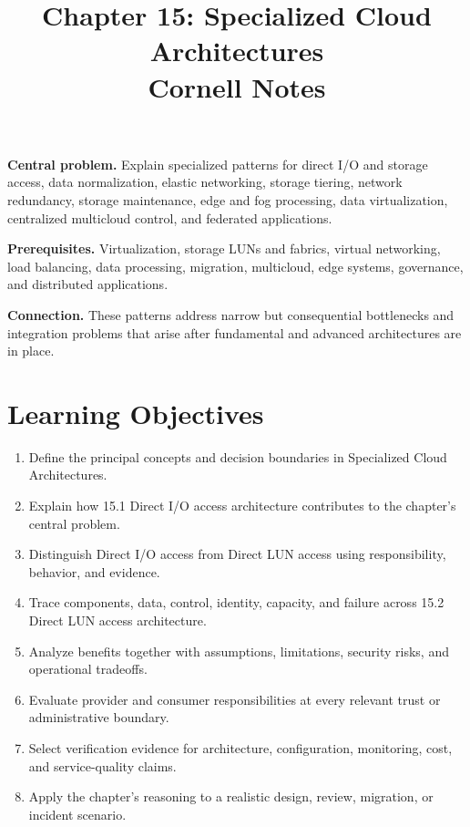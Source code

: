 \documentclass[11pt]{article}
\title{Chapter 15: Specialized Cloud Architectures\\[2mm]\large Cornell Notes}
\author{}
\date{}
\begin{document}
\maketitle
\thispagestyle{fancy}
\vspace{-1.5em}
\begin{orientationbox}
\textbf{Central problem.} Explain specialized patterns for direct I/O and storage access, data normalization, elastic networking, storage tiering, network redundancy, storage maintenance, edge and fog processing, data virtualization, centralized multicloud control, and federated applications.\par\smallskip
\textbf{Prerequisites.} Virtualization, storage LUNs and fabrics, virtual networking, load balancing, data processing, migration, multicloud, edge systems, governance, and distributed applications.\par\smallskip
\textbf{Connection.} These patterns address narrow but consequential bottlenecks and integration problems that arise after fundamental and advanced architectures are in place.
\end{orientationbox}
\section{Learning Objectives}
\begin{enumerate}
\item Define the principal concepts and decision boundaries in Specialized Cloud Architectures.
\item Explain how 15.1 Direct I/O access architecture contributes to the chapter's central problem.
\item Distinguish Direct I/O access from Direct LUN access using responsibility, behavior, and evidence.
\item Trace components, data, control, identity, capacity, and failure across 15.2 Direct LUN access architecture.
\item Analyze benefits together with assumptions, limitations, security risks, and operational tradeoffs.
\item Evaluate provider and consumer responsibilities at every relevant trust or administrative boundary.
\item Select verification evidence for architecture, configuration, monitoring, cost, and service-quality claims.
\item Apply the chapter's reasoning to a realistic design, review, migration, or incident scenario.
\end{enumerate}
\end{document}
